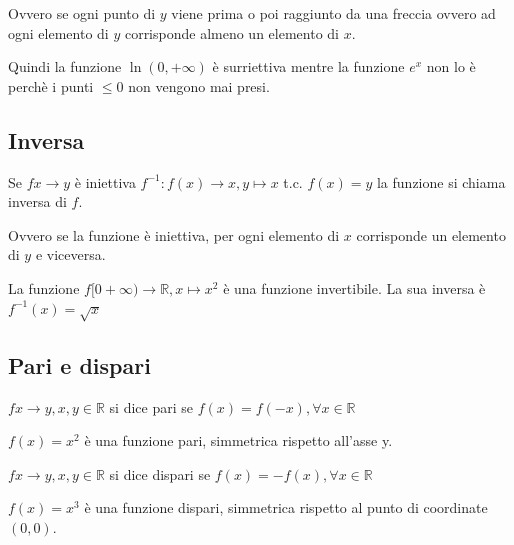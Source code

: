Ovvero se ogni punto di $y$ viene prima o poi raggiunto da una freccia ovvero ad ogni elemento di $y$ corrisponde almeno un elemento di $x$.

Quindi la funzione $\ln(0,+\infty)$ è surriettiva mentre la funzione $e^x$ non lo è perchè i punti $\leq 0$ non vengono mai presi.

\subsection*{Inversa}
\begin{definition}[Inversa]
    Se $fx\rightarrow y$ è iniettiva $f^{-1}:f(x)\rightarrow x, y\longmapsto x$ t.c. $f(x)=y$ la funzione si chiama inversa di $f$.
\end{definition}

Ovvero se la funzione è iniettiva, per ogni elemento di $x$ corrisponde un elemento di $y$ e viceversa.

\begin{example} La funzione $f[0+\infty)\rightarrow\mathbb{R},  x\longmapsto x^2$ è una funzione invertibile.
    La sua inversa è $f^{-1}(x)=\sqrt{x}$
    
    
\end{example}

\subsection*{Pari e dispari}
\begin{definition}[Pari]
    $fx\rightarrow y, x,y\in\mathbb{R}$ si dice pari se $f(x)=f(-x),\forall x\in\mathbb{R}$
\end{definition}
$f(x)=x^2$ è una funzione pari, simmetrica rispetto all'asse y.
\begin{definition}[Dispari]
    $fx\rightarrow y, x,y\in\mathbb{R}$ si dice dispari se $f(x)=-f(x),\forall x\in\mathbb{R}$
\end{definition}
$f(x)=x^3$ è una funzione dispari, simmetrica rispetto al punto di coordinate $(0,0)$.

